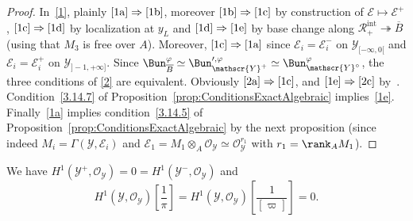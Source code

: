 \begin{proof}
In~\eqref{1}, plainly $\eqref{1a}\Rightarrow\eqref{1b}$, moreover $\eqref{1b}\Rightarrow\eqref{1c}$ by construction of $\mathscr{E}\mapsto\mathscr{E}^{+}$, $\eqref{1c}\Rightarrow\eqref{1d}$ by localization at $y_{L}$ and $\eqref{1d}\Rightarrow\eqref{1e}$ by base change along $\mathscr{R}_{+}^{\mathrm{int}}\twoheadrightarrow\overline{B}$ (using that $M_{3}$ is free over $A$). Moreover, $\eqref{1c}\Rightarrow\eqref{1a}$ since $\mathscr{E}_{i}=\mathscr{E}_{i}^{-}$ on $\mathscr{Y}_{[-\infty,0[}$ and $\mathscr{E}_{i}=\mathscr{E}_{i}^{+}$ on $\mathscr{Y}_{]-1,+\infty]}$. Since $\Bun_{\overline{B}}^{\varphi}\simeq\Bun_{\mathscr{Y}^{+}}^{\prime,\varphi}\simeq\Bun_{\mathscr{Y}^{\circ}}^{\varphi}$, the three conditions of \eqref{2} are equivalent. Obviously $\eqref{2a}\Rightarrow\eqref{1c}$, and $\eqref{1e}\Rightarrow\eqref{2c}$ by~\cite[\S 11.1]{FaFo15}. Condition~\eqref{3.14.7} of Proposition~\ref{prop:ConditionsExactAlgebraic} implies~\eqref{1e}. Finally~\eqref{1a} implies condition~\eqref{3.14.5} of Proposition~\ref{prop:ConditionsExactAlgebraic} by the next proposition (since indeed $M_{i}=\Gamma(\mathscr{Y},\mathscr{E}_{i})$ and $\mathscr{E}_{1}=M_{1}\otimes_{A}\mathscr{O}_{\mathscr{Y}}\simeq\mathscr{O}_{\mathscr{Y}}^{r_{1}}$ with $r_{1}=\rank_{A}M_{1}$).
\end{proof}

\begin{prop}
We have $H^{1}(\mathscr{Y}^{+},\mathscr{O}_{\mathscr{Y}})=0=H^{1}(\mathscr{Y}^{-},\mathscr{O}_{\mathscr{Y}})$ and
\[
H^{1}(\mathscr{Y},\mathscr{O}_{\mathscr{Y}})\!\left[{\frac{1}{\pi}}\right]=H^{1}(\mathscr{Y},\mathscr{O}_{\mathscr{Y}})\!\left[{\frac{1}{[\varpi]}}\right]=0.
\]
\end{prop}

